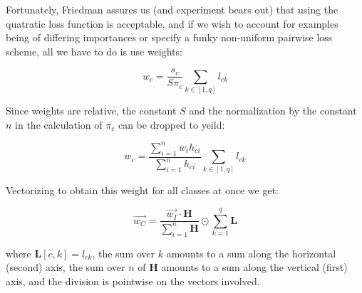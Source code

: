\documentclass[12pt]{article}
\begin{document}
Fortunately, Friedman assures us (and experiment bears out) that using the quatratic loss function is acceptable, and if we wish to account for examples being of differing importances or specify a funky non-uniform pairwise loss scheme, all we have to do is use weights:

$$w_c = \frac{s_c}{S \pi_c} \sum_{k \in [1,q]} l_{ck}$$

Since weights are relative, the constant $S$ and the normalization by the constant $n$ in the calculation of $\pi_c$ can be dropped to yeild:

$$w_c = \frac{\sum_{i=1}^n w_i h_{ci}}{\sum_{i=1}^n h_{ci}} \sum_{k \in [1,q]} l_{ck}$$

Vectorizing to obtain this weight for all classes at once we get:

$$\vec{w_C} = \frac{\vec{w_I} \cdot \pmb{H}}{\sum_{i=1}^n \pmb{H}} \odot \sum_{k=1}^q \pmb{L}$$

where $\pmb{L}[c,k] = l_{ck}$, the sum over $k$ amounts to a sum along the horizontal (second) axis, the sum over $n$ of $\pmb{H}$ amounts to a sum along the vertical (first) axis, and the division is pointwise on the vectors involved.
\end{document}
